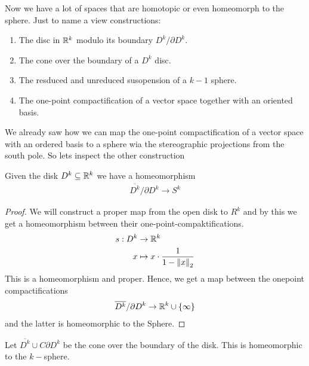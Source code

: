  
Now we have a lot of spaces that are homotopic or even homeomorph to the sphere. Just to name a view constructions:
\begin{enumerate}
	\item The disc in $\mathbb{R}^k$ modulo its boundary $D^k\slash \partial D^k$.
	\item The cone over the boundary of a $D^k$ disc. 
	\item The resduced and unreduced susopension of a $k-1$ sphere. 
	\item The one-point compactification of a vector space together with an oriented basis.
\end{enumerate}
We already saw how we can map the one-point compactification of a vector space with an ordered basis to a sphere wia the stereographic projections from the south pole. 
So lets inspect the other construction
\begin{cor}
	Given the disk $D^k\subseteq \mathbb{R}^k$ we have a homeomorphism 
	\begin{align*}
		\overline{D^k} \slash \partial D^k\to S^k
	\end{align*}
\end{cor}
\begin{proof}
	We will construct a proper map from the open disk to $R^k$ and by this we get a homeomorphism between their one-point-compaktifications.
	\begin{align*}
		s: D^k&\to \mathbb{R}^k\\
			x &\mapsto x \cdot \frac{1}{1-\left\lVert x\right\rVert_2}
	\end{align*}
	This is a homeomorphism and proper. Hence, we get a map between the onepoint compactifications
	\begin{align*}
		\overline{D^k}\slash \partial D^k \to \mathbb{R}^k\cup \{\infty\}
	\end{align*} and the latter is homeomorphic to the Sphere. 
\end{proof}
\begin{cor}
Let $\overline{D^k}\cup C \partial D^k$ be the cone over the boundary of the disk. This is homeomorphic to the $k-$sphere. 
\end{cor}
